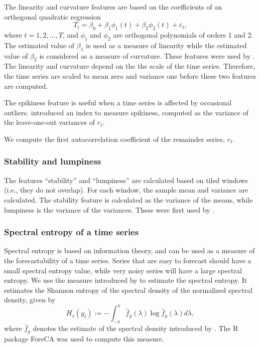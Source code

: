 \documentclass[11pt,a4paper,]{article}
\begin{document}
The linearity and curvature features are based on the coefficients of an orthogonal quadratic regression
\[
  T_t=\beta_0+\beta_1 \phi_1(t) + \beta_2\phi_2(t) + \varepsilon_t,
\]
where \(t=1, 2, \dots,T\), and \(\phi_1\) and \(\phi_2\) are orthogonal polynomials of orders 1 and 2. The estimated value of \(\beta_1\) is used as a measure of linearity while the estimated value of \(\beta_2\) is considered as a measure of curvature. These features were used by \textcite{hyndman2015large}. The linearity and curvature depend on the the scale of the time series. Therefore, the time series are scaled to mean zero and variance one before these two features are computed.

The spikiness feature is useful when a time series is affected by occasional outliers. \textcite{hyndman2015large} introduced an index to measure spikiness, computed as the variance of the leave-one-out variances of \(r_t\).

We compute the first autocorrelation coefficient of the remainder series, \(r_t\).

\hypertarget{stability-and-lumpiness}{%
\subsubsection*{Stability and lumpiness}\label{stability-and-lumpiness}}

The features ``stability'' and ``lumpiness'' are calculated based on tiled windows (i.e., they do not overlap). For each window, the sample mean and variance are calculated. The stability feature is calculated as the variance of the means, while lumpiness is the variance of the variances. These were first used by \textcite{hyndman2015large}.

\hypertarget{spectral-entropy-of-a-time-series}{%
\subsubsection*{Spectral entropy of a time series}\label{spectral-entropy-of-a-time-series}}

Spectral entropy is based on information theory, and can be used as a measure of the forecastability of a time series. Series that are easy to forecast should have a small spectral entropy value, while very noisy series will have a large spectral entropy. We use the measure introduced by \textcite{goerg2013forecastable} to estimate the spectral entropy. It estimates the Shannon entropy of the spectral density of the normalized spectral density, given by
\[
  H_{s}(y_t):=-\int_{-\pi}^{\pi}\hat f_y(\lambda)\log \hat f_y({\lambda})d\lambda,
\]
where \(\hat{f}_y\) denotes the estimate of the spectral density introduced by \textcite{nuttall1982spectral}. The R package ForeCA \autocite{Foreca} was used to compute this measure.
\end{document}
